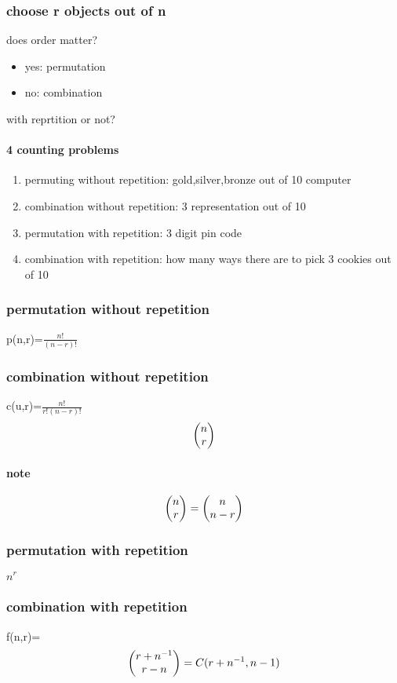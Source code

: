 \documentclass[a4paper,10pt]{article}
\begin{document}
\subsubsection{choose r objects out of n}
does order matter?
\begin{itemize}
 \item yes: permutation
 \item no: combination
\end{itemize}
with reprtition or not?
\paragraph{4 counting problems}
\begin{enumerate}
 \item permuting without repetition: gold,silver,bronze out of 10 computer
 \item combination without repetition: 3 representation out of 10
 \item permutation with repetition: 3 digit pin code
 \item combination with repetition: how many ways there are to pick 3 cookies out of 10
\end{enumerate}
\subsubsection{permutation without repetition}
p(n,r)=$\frac{n!}{(n-r)!}$
\subsubsection{combination without repetition}
c(u,r)=$\frac{n!}{r!(n-r)!}$
\newline
\[
\begin{pmatrix}
n\cr
r
\end{pmatrix}
\]
\paragraph{note}
\[
\begin{pmatrix}
 n\cr
 r\cr
\end{pmatrix}
=
\begin{pmatrix}
 n\cr
 n-r\cr
\end{pmatrix}
\]
\subsubsection{permutation with repetition}
$n^r$
\subsubsection{combination with repetition}
f(n,r)=
\[
\begin{pmatrix}
 r+n^{-1}\cr
 r-n\cr
\end{pmatrix}
=C(r+n^{-1},n-1)
\]
\end{document}
